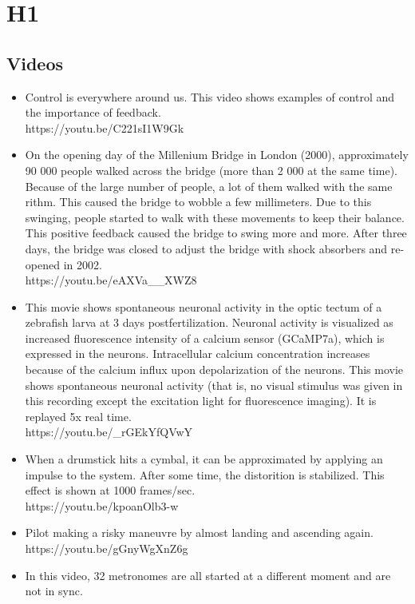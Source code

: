\documentclass{document}
\begin{document}
	\section{H1}
		\subsection{Videos}
		\begin{itemize}
			\item Control is everywhere around us. This video shows examples of control and the importance of feedback.\\
			https://youtu.be/C221sI1W9Gk
			\item On the opening day of the Millenium Bridge in London (2000), approximately 90 000 people walked across the bridge (more than 2 000 at the same time). Because of the large number of people, a lot of them walked with the same rithm. This caused the bridge to wobble a few millimeters. Due to this swinging, people started to walk with these movements to keep their balance. This positive feedback caused the bridge to swing more and more. 
			After three days, the bridge was closed to adjust the bridge with shock absorbers and re-opened in 2002.\\
			https://youtu.be/eAXVa__XWZ8
			\item This movie shows spontaneous neuronal activity in the optic tectum of a zebrafish larva at 3 days postfertilization. Neuronal activity is visualized as increased fluorescence intensity of a calcium sensor (GCaMP7a), which is expressed in the neurons. Intracellular calcium concentration increases because of the calcium influx upon depolarization of the neurons. This movie shows spontaneous neuronal activity (that is, no visual stimulus was given in this recording except the excitation light for fluorescence imaging). It is replayed 5x real time.\\
			https://youtu.be/_rGEkYfQVwY
			\item When a drumstick hits a cymbal, it can be approximated by applying an impulse to the system. After some time, the distorition is stabilized. This effect is shown at 1000 frames/sec. \\
			https://youtu.be/kpoanOlb3-w
			\item Pilot making a risky maneuvre by almost landing and ascending again.\\
			https://youtu.be/gGnyWgXnZ6g
			\item In this video, 32 metronomes are all started at a different moment and are not in sync.

\end{itemize}
\end{document}

